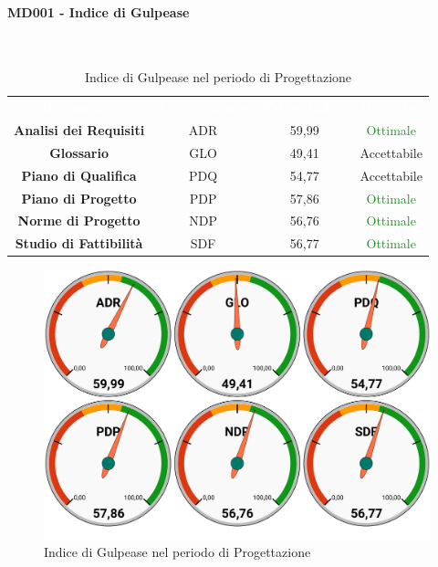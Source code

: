 \paragraph{MD001 - Indice di Gulpease}\mbox{}\\[0,3cm]
\begin{table}[H]
	\centering
	\begin{tabular}{cccc}
	\rowcolor{greySWEight}
	\textcolor{white}{\textbf{Documento}} & 
	\textcolor{white}{\textbf{Abbreviazione}} &
	\textcolor{white}{\textbf{Valore Indice}}&
	\textcolor{white}{\textbf{Riscontro}}\\
	
	\textbf{Analisi dei Requisiti} & ADR & 59,99 & \textcolor{ForestGreen}{Ottimale} \\
	\textbf{Glossario} & GLO & 49,41 & \textcolor{YellowOrange}{Accettabile} \\
	\textbf{Piano di Qualifica} & PDQ & 54,77 & \textcolor{YellowOrange}{Accettabile} \\
	\textbf{Piano di Progetto} & PDP & 57,86 & \textcolor{ForestGreen}{Ottimale} \\
	\textbf{Norme di Progetto} & NDP & 56,76 & \textcolor{ForestGreen}{Ottimale} \\
	\textbf{Studio di Fattibilità} & SDF & 56,77 & \textcolor{ForestGreen}{Ottimale} \\

	\end{tabular}
	\caption{Indice di Gulpease nel periodo di Progettazione}
\end{table}
\begin{figure}[H]
	\includegraphics[width=1\linewidth]{sez/App_Esito/Progettazione/graph/PR_Gulp.pdf}
	\caption{Indice di Gulpease nel periodo di Progettazione}
\end{figure}

